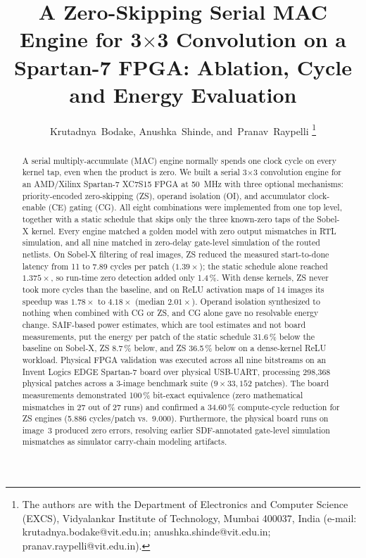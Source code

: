 \documentclass[11pt,journal,draftclsnofoot,onecolumn]{IEEEtran}
\begin{document}
\title{A Zero-Skipping Serial MAC Engine for 3$\times$3 Convolution on a Spartan-7 FPGA: Ablation, Cycle and Energy Evaluation}

\author{Krutadnya~Bodake, Anushka~Shinde, and~Pranav~Raypelli%
\thanks{The authors are with the Department of Electronics and Computer Science (EXCS), Vidyalankar Institute of Technology, Mumbai 400037, India (e-mail: krutadnya.bodake@vit.edu.in; anushka.shinde@vit.edu.in; pranav.raypelli@vit.edu.in).}}

\maketitle

\begin{abstract}
A serial multiply-accumulate (MAC) engine normally spends one clock cycle on every
kernel tap, even when the product is zero. We built a serial 3$\times$3 convolution
engine for an AMD/Xilinx Spartan-7 XC7S15 FPGA at 50~MHz with three optional mechanisms:
priority-encoded zero-skipping (ZS), operand isolation (OI), and accumulator
clock-enable (CE) gating (CG). All eight combinations were implemented from one top level,
together with a static schedule that skips only the three known-zero taps of the
Sobel-X kernel. Every engine matched a golden model with zero output mismatches in RTL
simulation, and all nine matched in zero-delay gate-level simulation of the routed
netlists. On Sobel-X filtering of real images, ZS reduced the measured start-to-done
latency from 11 to 7.89 cycles per patch ($1.39\times$); the static schedule alone
reached $1.375\times$, so run-time zero detection added only 1.4\,\%. With dense kernels,
ZS never took more cycles than the baseline, and on ReLU activation maps of 14 images its
speedup was $1.78\times$ to $4.18\times$ (median $2.01\times$). Operand isolation
synthesized to nothing when combined with CG or ZS, and CG alone gave no resolvable
energy change. SAIF-based power estimates, which are tool estimates and not board
measurements, put the energy per patch of the static schedule 31.6\,\% below the baseline
on Sobel-X, ZS 8.7\,\% below, and ZS 36.5\,\% below on a dense-kernel ReLU workload.
Physical FPGA validation was executed across all nine bitstreams on an Invent Logics
EDGE Spartan-7 board over physical USB-UART, processing 298{,}368 physical patches across
a 3-image benchmark suite ($9 \times 33{,}152$ patches). The board measurements
demonstrated 100\,\% bit-exact equivalence (zero mathematical mismatches in 27 out of 27
runs) and confirmed a 34.60\,\% compute-cycle reduction for ZS engines (5.886 cycles/patch
vs.\ 9.000). Furthermore, the physical board runs on image~3 produced zero errors,
resolving earlier SDF-annotated gate-level simulation mismatches as simulator carry-chain
modeling artifacts.
\end{abstract}
\end{document}
